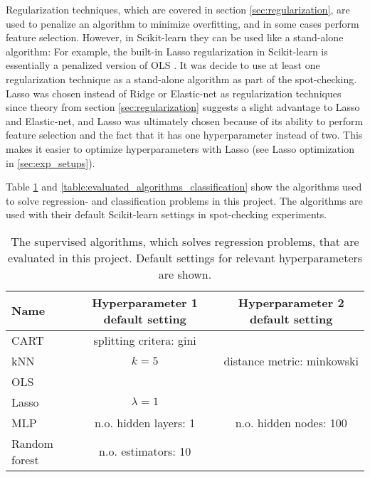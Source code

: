 	Regularization techniques, which are covered in section \ref{sec:regularization}, are used to penalize an algorithm to minimize overfitting, and in some cases perform feature selection. However, in Scikit-learn they can be used like a stand-alone algorithm: For example, the built-in Lasso regularization in Scikit-learn is essentially a penalized version of OLS \cite{WEBSITE:31}. It was decide to use at least one regularization technique as a stand-alone algorithm as part of the spot-checking. Lasso was chosen instead of Ridge or Elastic-net as regularization techniques since theory from section \ref{sec:regularization} suggests a slight advantage to Lasso and Elastic-net, and Lasso was ultimately chosen because of its ability to perform feature selection and the fact that it has one hyperparameter instead of two. This makes it easier to optimize hyperparameters with Lasso (see Lasso optimization in \ref{sec:exp_setups}). 

	Table \ref{table:evaluated_algorithms_regression} and \ref{table:evaluated_algorithms_classification} show the algorithms used to solve regression- and classification problems in this project. The algorithms are used with their default Scikit-learn settings in spot-checking experiments.
	\begin{table}[H]
		\centering
		\caption{The supervised algorithms, which solves regression problems, that are evaluated in this project. Default settings for relevant hyperparameters are shown.}
		\begin{tabular}[3]{l | c | c }
    			Name & Hyperparameter 1 default setting & Hyperparameter 2 default setting \\ 
			 \hline
			CART & splitting critera: gini &  \\ \hline
			kNN & $k = 5$ & distance metric: minkowski \\ \hline
			OLS &  & \\ \hline
			Lasso & $\lambda = 1$ & \\ \hline
			MLP & n.o. hidden layers: 1 & n.o. hidden nodes: 100 \\ \hline
			Random forest & n.o. estimators: 10 &   
			\label{table:evaluated_algorithms_regression}
		\end{tabular}
	\end{table}

